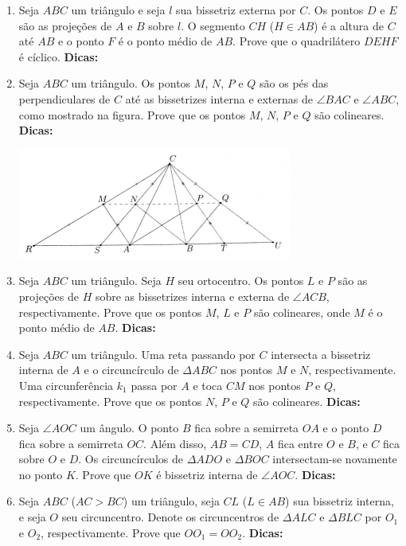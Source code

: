 \documentclass{article}
\newcommand{\dica}{\textbf{Dicas:}}
\newcommand{\iniTri}{Seja $ABC$ um triângulo}
\begin{document}
\begin{multicols}{2}
\begin{enumerate}
    \item Seja $ABC$ um triângulo e seja $l$ sua bissetriz externa por $C$. Os pontos $D$ e $E$ são as projeções de $A$ e $B$ sobre $l$. O segmento $CH$ ($H\in AB$) é a altura de $C$ até $AB$ e o ponto $F$ é o ponto médio de $AB$. Prove que o quadrilátero $DEHF$ é cíclico. \dica %
    
    \item \iniTri. Os pontos $M$, $N$, $P$ e $Q$ são os pés das perpendiculares de $C$ até as bissetrizes interna e externas de $\angle BAC$ e $\angle ABC$, como mostrado na figura. Prove que os pontos $M$, $N$, $P$ e $Q$ são colineares. \dica %
    
    \includegraphics[scale=0.75]{img/img001.png}
    
    \item \iniTri. Seja $H$ seu ortocentro. Os pontos $L$ e $P$ são as projeções de $H$ sobre as bissetrizes interna e externa de $\angle ACB$, respectivamente. Prove que os pontos $M$, $L$ e $P$ são colineares, onde $M$ é o ponto médio de $AB$. \dica %
    
    \item \iniTri. Uma reta passando por $C$ intersecta a bissetriz interna de $A$ e o circuncírculo de $\Delta ABC$ nos pontos $M$ e $N$, respectivamente. Uma circunferência $k_1$ passa por $A$ e toca $CM$ nos pontos $P$ e $Q$, respectivamente. Prove que os pontos $N$, $P$ e $Q$ são colineares. \dica %
    
    \item Seja $\angle AOC$ um ângulo. O ponto $B$ fica sobre a semirreta $OA$ e o ponto $D$ fica sobre a semirreta $OC$. Além disso, $AB=CD$, $A$ fica entre $O$ e $B$, e $C$ fica sobre $O$ e $D$. Os circuncírculos de $\Delta ADO$ e $\Delta BOC$ intersectam-se novamente no ponto $K$. Prove que $OK$ é bissetriz interna de $\angle AOC$. \dica %
    
    \item Seja $ABC$ ($AC>BC$) um triângulo, seja $CL$ ($L\in AB$) sua bissetriz interna, e seja $O$ seu circuncentro. Denote os circuncentros de $\Delta ALC$ e $\Delta BLC$ por $O_1$ e $O_2$, respectivamente. Prove que $OO_1=OO_2$. \dica %
    

\end{enumerate}
\end{multicols}
\end{document}
